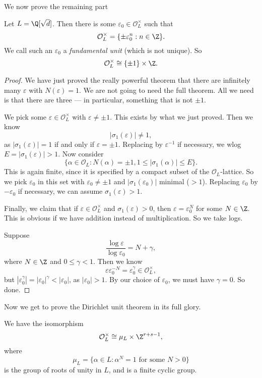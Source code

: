 \documentclass[a4paper]{article}
\begin{document}
We now prove the remaining part
\begin{thm}
  Let $L = \Q[\sqrt{d}]$. Then there is some $\varepsilon_0 \in \mathcal{O}_L^\times$ such that
  \[
    \mathcal{O}_L^\times = \{\pm \varepsilon_0^n : n \in \Z\}.
  \]
  We call such an $\varepsilon_0$ a \emph{fundamental unit} (which is not unique). So
  \[
    \mathcal{O}_L^\times \cong \{\pm 1\} \times \Z.
  \]
\end{thm}

\begin{proof}
  We have just proved the really powerful theorem that there are infinitely many $\varepsilon$ with $N(\varepsilon) = 1$. We are not going to need the full theorem. All we need is that there are three --- in particular, something that is not $\pm 1$.

  We pick some $\varepsilon \in \mathcal{O}_L^\times$ with $\varepsilon \not= \pm 1$. This exists by what we just proved. Then we know
  \[
    |\sigma_1(\varepsilon)| \not= 1,
  \]
  as $|\sigma_1(\varepsilon)| = 1$ if and only if $\varepsilon = \pm 1$. Replacing by $\varepsilon^{-1}$ if necessary, we wlog $E = |\sigma_1(\varepsilon)| > 1$. Now consider
  \[
    \{\alpha \in \mathcal{O}_L: N(\alpha) = \pm 1, 1 \leq |\sigma_1(\alpha)| \leq E\}.
  \]
  This is again finite, since it is specified by a compact subset of the $\mathcal{O}_L$-lattice. So we pick $\varepsilon_0$ in this set with $\varepsilon_0 \not= \pm 1$ and $|\sigma_1(\varepsilon_0)|$ minimal ($> 1$). Replacing $\varepsilon_0$ by $-\varepsilon_0$ if necessary, we can assume $\sigma_1(\varepsilon) > 1$.

  Finally, we claim that if $\varepsilon \in \mathcal{O}_L^\times$ and $\sigma_1(\varepsilon) > 0$, then $\varepsilon = \varepsilon_0^N$ for some $N \in \Z$. This is obvious if we have addition instead of multiplication. So we take logs.

  Suppose
  \[
    \frac{\log \varepsilon}{\log \varepsilon_0} = N + \gamma,
  \]
  where $N \in \Z$ and $0 \leq \gamma < 1$. Then we know
  \[
    \varepsilon\varepsilon_0^{-N} = \varepsilon_0^\gamma \in \mathcal{O}_L^{\times},
  \]
  but $|\varepsilon_0^\gamma| = |\varepsilon_0|^\gamma < |\varepsilon_0|$, as $|\varepsilon_0| > 1$. By our choice of $\varepsilon_0$, we must have $\gamma = 0$. So done.
\end{proof}

Now we get to prove the Dirichlet unit theorem in its full glory.
\begin{thm}
  We have the isomorphism
  \[
    \mathcal{O}_L^\times \cong \mu_L \times \Z^{r + s - 1},
  \]
  where
  \[
    \mu_L = \{\alpha \in L: \alpha^N = 1\text{ for some }N > 0\}
  \]
  is the group of roots of unity in $L$, and is a finite cyclic group.
\end{thm}
\end{document}
